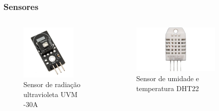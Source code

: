 \documentclass{beamer}
\begin{document}
	
	\begin{frame}
		\frametitle{Sensores}
		\begin{columns}
				\begin{figure}[htb]
					\includegraphics[width=0.8\textwidth]{img/sensor_uvma.jpg}
					\caption{Sensor de radiação ultravioleta UVM -30A}
				\end{figure}
				
				\begin{figure}[htb]
					\includegraphics[width=0.8\textwidth]{img/sensor_dht22.jpg}
					\caption{Sensor de umidade e temperatura DHT22}
				\end{figure}
		\end{columns}
				
	\end{frame}
	
\end{document}
